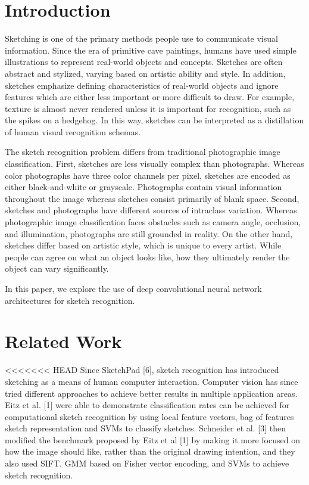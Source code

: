 \documentclass[10pt,twocolumn,letterpaper]{article}
\begin{document}
\section{Introduction}
Sketching is one of the primary methods people use to communicate visual information. Since the era of primitive cave paintings, humans have used simple illustrations to represent real-world objects and concepts. Sketches are often abstract and stylized, varying based on artistic ability and style. In addition, sketches emphasize defining characteristics of real-world objects and ignore features which are either less important or more difficult to draw. For example, texture is almost never rendered unless it is important for recognition, such as the spikes on a hedgehog. In this way, sketches can be interpreted as a distillation of human visual recognition schemas.

The sketch recognition problem differs from traditional photographic image classification. First, sketches are less visually complex than photographs. Whereas color photographs have three color channels per pixel, sketches are encoded as either black-and-white or grayscale. Photographs contain visual information throughout the image whereas sketches consist primarily of blank space. Second, sketches and photographs have different sources of intraclass variation. Whereas photographic image classification faces obstacles such as camera angle, occlusion, and illumination, photographs are still grounded in reality. On the other hand, sketches differ based on artistic style, which is unique to every artist. While people can agree on what an object looks like, how they ultimately render the object can vary significantly.

In this paper, we explore the use of deep convolutional neural network architectures for sketch recognition.

\section{Related Work}
<<<<<<< HEAD
Since SketchPad [6], sketch recognition has introduced sketching as a means of human computer interaction. Computer vision has since tried different approaches to achieve better results in multiple application areas. Eitz et al. [1] were able to demonstrate classification rates can be achieved for computational sketch recognition by using local feature vectors, bag of features sketch representation and SVMs to classify sketches. Schneider et al. [3] then modified the benchmark proposed by Eitz et al [1] by making it more focused on how the image should like, rather than the original drawing intention, and they also used SIFT, GMM based on Fisher vector encoding, and SVMs to achieve sketch recognition.
\end{document}
